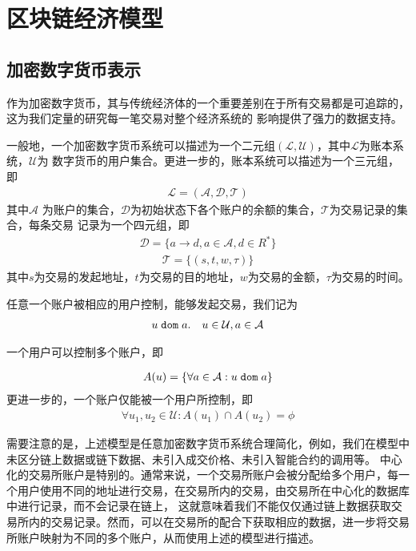 \section{区块链经济模型}


\subsection{加密数字货币表示}
作为加密数字货币，其与传统经济体的一个重要差别在于所有交易都是可追踪的，这为我们定量的研究每一笔交易对整个经济系统的
影响提供了强力的数据支持。

一般地，一个加密数字货币系统可以描述为一个二元组$(\mathcal{L}, \mathcal{U})$，其中$\mathcal{L}$为账本系统，$\mathcal{U}$为
数字货币的用户集合。更进一步的，账本系统可以描述为一个三元组，即
\begin{align}
\mathcal{L} = (\mathcal{A}, \mathcal{D}, \mathcal{T})
\end{align}
\noindent 其中$\mathcal{A}$ 为账户的集合，$\mathcal{D}$为初始状态下各个账户的余额的集合，$\mathcal{T}$为交易记录的集合，每条交易
记录为一个四元组，即
\begin{align}
\mathcal{D} = \{a \rightarrow d, a{\in}\mathcal{A}, d{\in}R^*\}
\end{align}
\begin{align}
\mathcal{T} = \{(s, t, w, \tau)\}
\end{align}
\noindent 其中$s$为交易的发起地址，$t$为交易的目的地址，$w$为交易的金额，$\tau$为交易的时间。

任意一个账户被相应的用户控制，能够发起交易，我们记为
\begin{align}
u {\; \texttt{dom}\;} a. \quad u\in \mathcal{U}, a\in \mathcal{A}
\end{align}

\noindent 一个用户可以控制多个账户，即

\begin{align}
A(u) = \{\forall a\in \mathcal{A} : u {\; \texttt{dom}\;} a\}
\end{align}
\noindent 更进一步的，一个账户仅能被一个用户所控制，即
\begin{align}
\forall u_1, u_2 \in \mathcal{U} : A(u_1) \cap A(u_2) = \phi
\end{align}

需要注意的是，上述模型是任意加密数字货币系统合理简化，例如，我们在模型中未区分链上数据或链下数据、未引入成交价格、未引入智能合约的调用等。
中心化的交易所账户是特别的。通常来说，一个交易所账户会被分配给多个用户，每一个用户使用不同的地址进行交易，在交易所内的交易，由交易所在中心化的数据库中进行记录，而不会记录在链上，
这就意味着我们不能仅仅通过链上数据获取交易所内的交易记录。然而，可以在交易所的配合下获取相应的数据，进一步将交易所账户映射为不同的多个账户，从而使用上述的模型进行描述。



